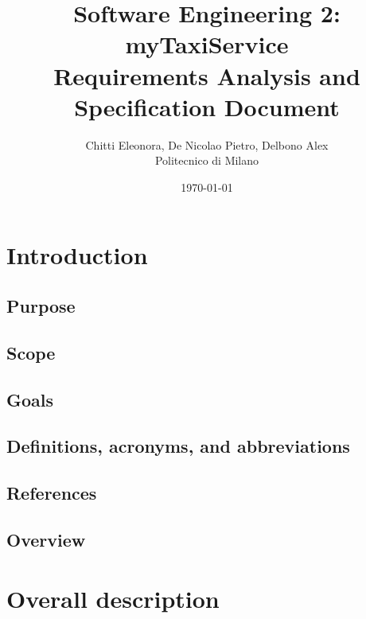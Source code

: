 \documentclass[12pt, a4paper]{report}
\begin{document}
\title{Software Engineering 2: myTaxiService \\ \vspace{1em} Requirements Analysis and Specification Document}
\author{Chitti Eleonora, De Nicolao Pietro, Delbono Alex\\
Politecnico di Milano}
\date{\today}
\maketitle
\tableofcontents

\chapter{Introduction}
\label{ch:introduction}

\section{Purpose}


\section{Scope}


\section{Goals}


\section{Definitions, acronyms, and abbreviations}


\section{References}


\section{Overview}


\chapter{Overall description}
\label{ch:overall-desc}
\end{document}
